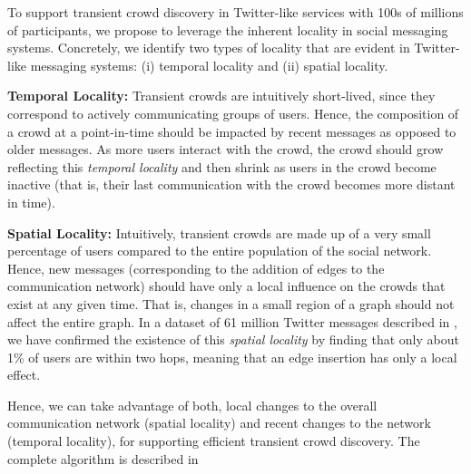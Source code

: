 \documentclass{sig-alternate}
\begin{document}
To support transient crowd discovery in Twitter-like services with 100s of
millions of participants, we propose to leverage the inherent locality in social
messaging systems. Concretely, we identify two types of locality that are
evident in Twitter-like messaging systems: (i) temporal locality and (ii) spatial
locality.

\medskip \noindent\textbf{Temporal Locality:} Transient crowds are
intuitively short-lived, since they correspond to actively communicating groups
of users. Hence, the composition of a crowd at a point-in-time should be impacted
by recent messages as opposed to older messages. As more users interact with the
crowd, the crowd should grow reflecting this \textit{temporal locality} and then
shrink as users in the crowd become inactive (that is, their last communication
with the crowd becomes more distant in time).

\medskip \noindent \textbf{Spatial Locality:} Intuitively, transient crowds are
made up of a very small percentage of users compared to the entire population of
the social network. Hence, new messages (corresponding to the addition of edges
to the communication network) should have only a local influence on the crowds
that exist at any given time. That is, changes in a small region of a graph
should not affect the entire graph. In a dataset of 61 million Twitter messages
described in \cite{Kamath:2011:TCD}, we have confirmed the existence of
this \textit{spatial locality} by finding that only about 1\% of users are within
two hops, meaning that an edge insertion has only a local effect.

\medskip Hence, we can take advantage of both, local changes to the overall
communication network (spatial locality) and recent changes to the network
(temporal locality), for supporting efficient transient crowd discovery. The complete algorithm is described in \cite{Kamath:2011:TCD}
\end{document}
